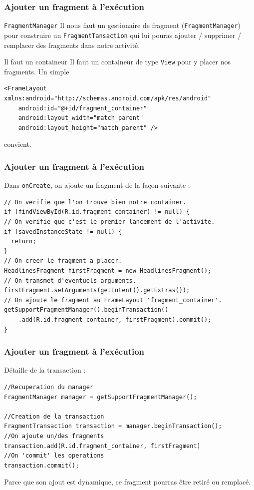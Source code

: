 \documentclass{beamer}
\begin{document}
\begin{frame}[fragile]
\frametitle{Ajouter un fragment à l'exécution}

\begin{block}{\verb!FragmentManager!}
Il nous faut un gestionaire de fragment (\verb!FragmentManager!) pour construire un \verb!FragmentTansaction! qui lui pouras ajouter / supprimer / remplacer des fragments dans notre activité.
\end{block}
\pause
\begin{alertblock}{Il faut un containeur}
Il faut un containeur de type \verb!View! pour y placer nos fragments. Un simple
\lstset{language=xml}
\begin{lstlisting}
<FrameLayout xmlns:android="http://schemas.android.com/apk/res/android"
    android:id="@+id/fragment_container"
    android:layout_width="match_parent"
    android:layout_height="match_parent" />
\end{lstlisting}
    convient.
\end{alertblock}
\end{frame}





\begin{frame}[fragile]
\frametitle{Ajouter un fragment à l'exécution}
\begin{block}{}
Dans \verb!onCreate!, on ajoute un fragment de la façon suivante :
\end{block}
\lstset{language=java}
\begin{lstlisting}
// On verifie que l'on trouve bien notre container.
if (findViewById(R.id.fragment_container) != null) {
// On verifie que c'est le premier lancement de l'activite.
if (savedInstanceState != null) {
  return;
}
// On creer le fragment a placer.
HeadlinesFragment firstFragment = new HeadlinesFragment();          
// On transmet d'eventuels arguments.
firstFragment.setArguments(getIntent().getExtras());         
// On ajoute le fragment au FrameLayout 'fragment_container'.
getSupportFragmentManager().beginTransaction()
    .add(R.id.fragment_container, firstFragment).commit();
}
\end{lstlisting}
\end{frame}

\begin{frame}[fragile]
\frametitle{Ajouter un fragment à l'exécution}

\begin{block}{Détaille de la transaction :}
\begin{lstlisting}
//Recuperation du manager
FragmentManager manager = getSupportFragmentManager();

//Creation de la transaction
FragmentTransaction transaction = manager.beginTransaction();
//On ajoute un/des fragments
transaction.add(R.id.fragment_container, firstFragment)
//On 'commit' les operations
transaction.commit();
\end{lstlisting}
\end{block}
\begin{exampleblock}{}
Parce que son ajout est dynamique, ce fragment pourras être retiré ou remplacé.
\end{exampleblock}
\end{frame}
\end{document}

